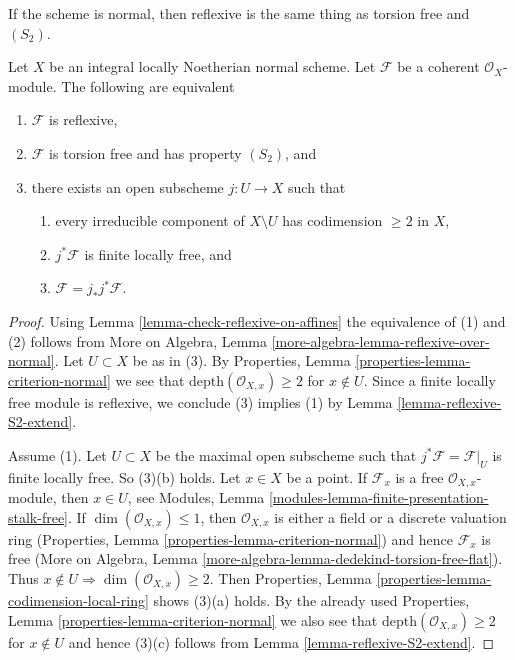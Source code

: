 \noindent
If the scheme is normal, then reflexive is the same thing as
torsion free and $(S_2)$.

\begin{lemma}
\label{lemma-reflexive-over-normal}
Let $X$ be an integral locally Noetherian normal scheme.
Let $\mathcal{F}$ be a coherent $\mathcal{O}_X$-module.
The following are equivalent
\begin{enumerate}
\item $\mathcal{F}$ is reflexive,
\item $\mathcal{F}$ is torsion free and has property $(S_2)$, and
\item there exists an open subscheme $j : U \to X$ such that
\begin{enumerate}
\item every irreducible component of $X \setminus U$
has codimension $\geq 2$ in $X$,
\item $j^*\mathcal{F}$ is finite locally free, and
\item $\mathcal{F} = j_*j^*\mathcal{F}$.
\end{enumerate}
\end{enumerate}
\end{lemma}

\begin{proof}
Using Lemma \ref{lemma-check-reflexive-on-affines}
the equivalence of (1) and (2) follows from
More on Algebra, Lemma \ref{more-algebra-lemma-reflexive-over-normal}.
Let $U \subset X$ be as in (3). By
Properties, Lemma \ref{properties-lemma-criterion-normal}
we see that $\text{depth}(\mathcal{O}_{X, x}) \geq 2$
for $x \not \in U$. Since a finite locally free module is reflexive,
we conclude (3) implies (1) by Lemma \ref{lemma-reflexive-S2-extend}.

\medskip\noindent
Assume (1). Let $U \subset X$ be the maximal open subscheme such
that $j^*\mathcal{F} = \mathcal{F}|_U$
is finite locally free. So (3)(b) holds. Let $x \in X$ be a point.
If $\mathcal{F}_x$ is a free $\mathcal{O}_{X, x}$-module, then
$x \in U$, see
Modules, Lemma \ref{modules-lemma-finite-presentation-stalk-free}.
If $\dim(\mathcal{O}_{X, x}) \leq 1$, then $\mathcal{O}_{X, x}$
is either a field or a discrete valuation ring
(Properties, Lemma \ref{properties-lemma-criterion-normal})
and hence $\mathcal{F}_x$ is free (More on Algebra, Lemma
\ref{more-algebra-lemma-dedekind-torsion-free-flat}).
Thus $x \not \in U \Rightarrow \dim(\mathcal{O}_{X, x}) \geq 2$.
Then Properties, Lemma \ref{properties-lemma-codimension-local-ring}
shows (3)(a) holds. By the already used
Properties, Lemma \ref{properties-lemma-criterion-normal}
we also see that $\text{depth}(\mathcal{O}_{X, x}) \geq 2$
for $x \not \in U$ and hence (3)(c) follows from
Lemma \ref{lemma-reflexive-S2-extend}.
\end{proof}

